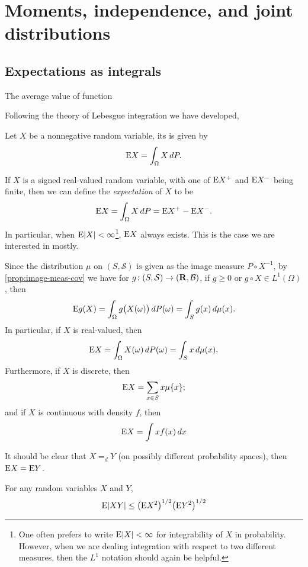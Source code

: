 \section{Moments, independence, and joint distributions} \label{sec:moment-indep-joint}

\subsection{Expectations as integrals}

The average value of function

Following the theory of Lebesgue integration we have developed, 

\begin{defn}
    Let $X$ be a nonnegative random variable, its  is given by \[
    \mathop{}\!\mathrm{E} X = \int_\Omega X\,dP.
    \]
    
    If $X$ is a signed real-valued random variable, with one of $\mathop{}\!\mathrm{E} X^+$ and $\mathop{}\!\mathrm{E} X^-$ being finite, then we can define the \emph{expectation} of $X$ to be \[
        \mathop{}\!\mathrm{E} X = \int_\Omega X\,dP = \mathop{}\!\mathrm{E} X^+ - \mathop{}\!\mathrm{E} X^-.
    \]
    In particular, when $\mathop{}\!\mathrm{E} \lvert X \rvert < \infty$\footnote{One often prefers to write $\mathop{}\!\mathrm{E}\lvert X \rvert < \infty$ for integrability of $X$ in probability. However, when we are dealing integration with respect to two different measures, then the $L^1$ notation should again be helpful.}, $\mathop{}\!\mathrm{E} X$ always exists. This is the case we are interested in mostly.
\end{defn}

Since the distribution $\mu$ on $(S,\mathcal{S})$ is given as the image measure $P\circ X^{-1}$, by \cref{prop:image-meas-cov} we have for $g\colon (S,\mathcal S) \to (\mathbf{R},\mathcal{B})$, if $g \geq 0$ or $g\circ X \in L^1(\Omega)$, then \[
    \mathop{}\!\mathrm{E} g(X) = \int_\Omega g\bigl(X(\omega)\bigr)\,dP(\omega) = \int_S g(x) \,d\mu(x).
\] In particular, if $X$ is real-valued, then \[
    \mathop{}\!\mathrm{E} X = \int_\Omega X(\omega)\,dP(\omega) = \int_S x\,d\mu(x).
\] Furthermore, if $X$ is discrete, then \[
    \mathop{}\!\mathrm{E} X = \sum_{x \in S} x \mu\{x\}; 
\] and if $X$ is continuous with density $f$, then \[
    \mathop{}\!\mathrm{E} X = \int x f(x)\,dx
\]

It should be clear that $X =_d Y$ (on possibly different probability spaces), then $\mathop{}\!\mathrm{E} X = \mathop{}\!\mathrm{E} Y$.

\begin{namedthm} \label{thm:c-s-ineq-prob} For any random variables $X$ and $Y$, 
    \[\mathop{}\!\mathrm{E} \lvert XY \rvert \leq \bigl(\mathop{}\!\mathrm{E} X^2\bigr)^{1/2} \bigl(\mathop{}\!\mathrm{E} Y^2\bigr)^{1/2}\]
\end{namedthm}

